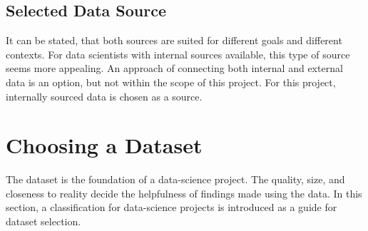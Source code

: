 	\subsection{Selected Data Source}
	It can be stated, that both sources are suited for different goals and different contexts. For data scientists with internal sources available, this type of source seems more appealing. An approach of connecting both internal and external data is an option, but not within the scope of this project. For this project, internally sourced data is chosen as a source.
	
	\section{Choosing a Dataset}
	The dataset is the foundation of a data-science project. The quality, size, and closeness to reality decide the helpfulness of findings made using the data.
	In this section, a classification for data-science projects is introduced as a guide for dataset selection.
	
